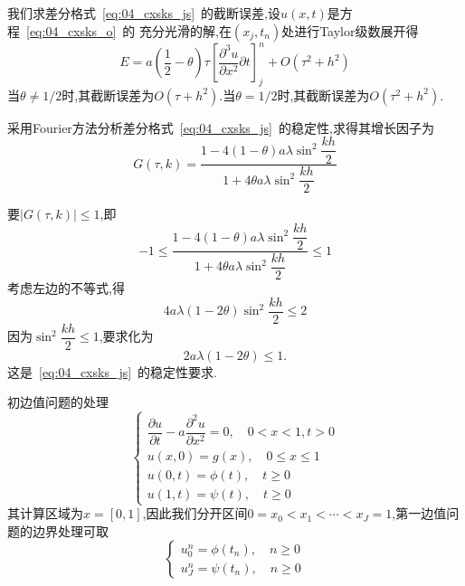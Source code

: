 \documentclass[xcolor=svgnames]{beamer} %
\begin{document}
\begin{frame}
 我们求差分格式~\eqref{eq:04_cxsks_js}~的截断误差,设$u(x,t)$是方程~\eqref{eq:04_cxsks_o}~的
充分光滑的解,在$(x_j,t_n)$处进行Taylor级数展开得
\begin{equation*}
E=a\left(\dfrac{1}{2}-\theta\right)\tau\left[\dfrac{\partial^3 u}{\partial x^2}{\partial t}\right]_j^n
+O(\tau^2+h^2)
\end{equation*}
当$\theta\not=1/2$时,其截断误差为$O(\tau+h^2)$.当$\theta=1/2$时,其截断误差为$O(\tau^2+h^2)$.\par
采用Fourier方法分析差分格式~\eqref{eq:04_cxsks_js}~的稳定性,求得其增长因子为
\begin{equation}
 G(\tau,k)=\dfrac{1-4(1-\theta)a\lambda\sin^2\dfrac{kh}{2}}{1+4\theta a\lambda\sin^2\dfrac{kh}{2}}
\end{equation}
\end{frame}
\begin{frame}
要$|G(\tau,k)|\leq 1$,即
\begin{equation*}
 -1\leq\dfrac{1-4(1-\theta)a\lambda\sin^2\dfrac{kh}{2}}{1+4\theta a\lambda\sin^2\dfrac{kh}{2}}\leq 1
\end{equation*}
考虑左边的不等式,得
\begin{equation*}
4a\lambda(1-2\theta)\sin^2\dfrac{kh}{2}\leq2
\end{equation*}
因为$\sin^2\dfrac{kh}{2}\leq 1$,要求化为
\begin{equation}
 2a\lambda(1-2\theta)\leq 1.
\end{equation}
这是~\eqref{eq:04_cxsks_js}~的稳定性要求.
\end{frame}
\begin{frame}{初边值问题的处理}
\begin{equation}
\begin{cases}
\dfrac{\partial u}{\partial t}-a\dfrac{\partial^2 u}{\partial x^2}=0,\quad 0<x<1,t>0 \\
u(x,0)=g(x),\quad 0\leq x\leq 1 \\
u(0,t)=\phi(t),\quad t\geq 0 \\
u(1,t)=\psi(t),\quad t\geq 0 
\end{cases}
\end{equation}
其计算区域为$x=[0,1]$,因此我们分开区间$0=x_0<x_1<\cdots<x_J=1$,第一边值问题的边界处理可取
\begin{equation}
\begin{cases}
u_0^n=\phi(t_n),\quad n\geq0 \\
u_J^n=\psi(t_n),\quad n\geq0
\end{cases}
\end{equation}\par
\end{frame}
\end{document}
